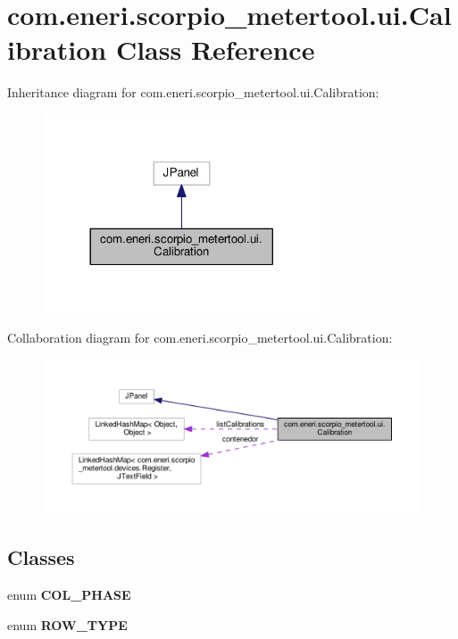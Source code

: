 \hypertarget{classcom_1_1eneri_1_1scorpio__metertool_1_1ui_1_1_calibration}{}\section{com.\+eneri.\+scorpio\+\_\+metertool.\+ui.\+Calibration Class Reference}
\label{classcom_1_1eneri_1_1scorpio__metertool_1_1ui_1_1_calibration}


Inheritance diagram for com.\+eneri.\+scorpio\+\_\+metertool.\+ui.\+Calibration\+:
\nopagebreak
\begin{figure}[H]
\begin{center}
\leavevmode
\includegraphics[width=233pt]{classcom_1_1eneri_1_1scorpio__metertool_1_1ui_1_1_calibration__inherit__graph}
\end{center}
\end{figure}


Collaboration diagram for com.\+eneri.\+scorpio\+\_\+metertool.\+ui.\+Calibration\+:
\nopagebreak
\begin{figure}[H]
\begin{center}
\leavevmode
\includegraphics[width=350pt]{classcom_1_1eneri_1_1scorpio__metertool_1_1ui_1_1_calibration__coll__graph}
\end{center}
\end{figure}
\subsection*{Classes}
\begin{DoxyCompactItemize}
\item 
enum {\bfseries C\+O\+L\+\_\+\+P\+H\+A\+SE}
\item 
enum {\bfseries R\+O\+W\+\_\+\+T\+Y\+PE}
\end{DoxyCompactItemize}
